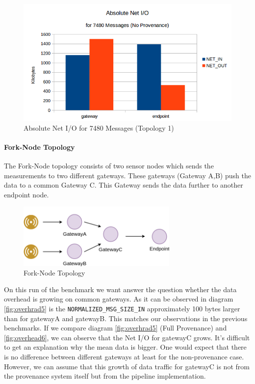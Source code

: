 \begin{figure}[H]
	\center
	\includegraphics[width=\textwidth]{figures/overheaddiagram8.png}
	\caption{Absolute Net I/O for 7480 Messages (Topology 1)}
	\label{fig:topo1absolutewithouotprov}
\end{figure}

\paragraph*{Fork-Node Topology}
The Fork-Node topology consists of two sensor nodes which sends the measurements to two different gateways. These gateways (Gateway A,B) push the data to a common Gateway C. This Gateway sends the data further to another endpoint node.

\begin{figure}[H]
	\center
	\includegraphics[width=0.7\textwidth]{figures/dataoverheadtopolabeled2.png}
	\caption{Fork-Node Topology}
	\label{fig:deployment}
\end{figure}

On this run of the benchmark we want answer the question whether the data overhead is growing on common gateways. As it can be observed in diagram \ref{fig:overhrad5} is the \texttt{NORMALIZED\_MSG\_SIZE\_IN} approximately 100 bytes larger than for gatewayA and gatewayB. This matches our observations in the previous benchmarks.
If we compare diagram \ref{fig:overhrad5} (Full Provenance) and  \ref{fig:overhead6}, we can observe that the Net I/O for gatewayC grows. It's difficult to get an explanation why the mean data is bigger. One would expect that there is no difference between different gateways at least for the non-provenance case.
However, we can assume that this growth of data traffic for gatewayC is not from the provenance system itself but from the pipeline implementation.

